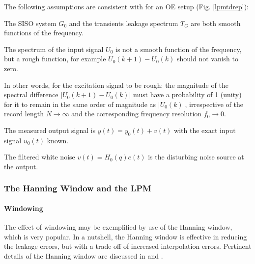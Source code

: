 The following assumptions are consistent with \cite{schoukens2010nonparametric} for an OE setup (Fig. \ref{lpmtdrep}):
\begin{assumption}
The SISO system $G_0$ and  the transients leakage spectrum $T_G$ are both smooth functions of the frequency.
\end{assumption}



\begin{assumption}

The spectrum of the  input signal $U_0$ is not a smooth function of the frequency, but a rough function, for example $U_0(k+1) - U_0(k)$ should not vanish to zero. %
\end{assumption}

In other words, for the excitation signal to be rough: the magnitude of the spectral difference $|U_0(k+1) - U_0(k)|$ must have a probability of 1 (unity) for it to remain in the same order of magnitude as $|U_0(k)|$, irrespective of the record length $N\rightarrow\infty$ and the corresponding  frequency resolution $f_0\rightarrow{0}$.


\begin{assumption}
The measured output signal is $y(t) = y_0(t) + v(t)$ with the exact input signal $u_0(t)$ known. 
\end{assumption}


\begin{assumption}
The filtered white noise $v(t) = H_0(q)e(t)$ is the disturbing noise source at the output.
\end{assumption}


\subsubsection{The Hanning Window and the LPM}\label{se:LPMFRFest}%
\paragraph{Windowing}
The effect of windowing may be  exemplified by use of the Hanning window, which is very popular.  In a nutshell, the Hanning window is effective in reducing  the leakage errors, but  with a trade off of increased interpolation errors. %
Pertinent details of the Hanning window are discussed in \cite{schoukens2006leakagereduction,Antoni20071723,schoukens2010nonparametric,Wellstead198155} and \cite{harris1978}.

